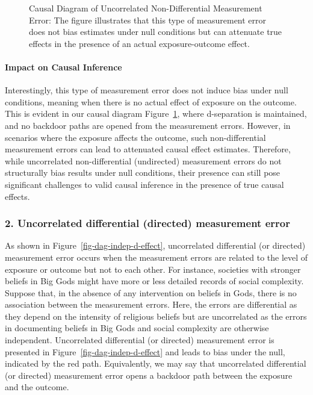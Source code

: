 \documentclass[
  singlecolumn,
  9pt]{article}
\let\oldparagraph\paragraph
\renewcommand{\paragraph}[1]{\oldparagraph{#1}\mbox{}}
\begin{document}
\begin{figure}


\caption{\label{fig-2}Causal Diagram of Uncorrelated Non-Differential
Measurement Error: The figure illustrates that this type of measurement
error does not bias estimates under null conditions but can attenuate
true effects in the presence of an actual exposure-outcome effect.}

\end{figure}%

\paragraph{Impact on Causal Inference}\label{impact-on-causal-inference}

Interestingly, this type of measurement error does not induce bias under
null conditions, meaning when there is no actual effect of exposure on
the outcome. This is evident in our causal diagram Figure~\ref{fig-2},
where d-separation is maintained, and no backdoor paths are opened from
the measurement errors. However, in scenarios where the exposure affects
the outcome, such non-differential measurement errors can lead to
attenuated causal effect estimates. Therefore, while uncorrelated
non-differential (undirected) measurement errors do not structurally
bias results under null conditions, their presence can still pose
significant challenges to valid causal inference in the presence of true
causal effects.

\subsubsection{2. Uncorrelated differential (directed) measurement
error}\label{uncorrelated-differential-directed-measurement-error}

As shown in Figure~\ref{fig-dag-indep-d-effect}, uncorrelated
differential (or directed) measurement error occurs when the measurement
errors are related to the level of exposure or outcome but not to each
other. For instance, societies with stronger beliefs in Big Gods might
have more or less detailed records of social complexity. Suppose that,
in the absence of any intervention on beliefs in Gods, there is no
association between the measurement errors. Here, the errors are
differential as they depend on the intensity of religious beliefs but
are uncorrelated as the errors in documenting beliefs in Big Gods and
social complexity are otherwise independent. Uncorrelated differential
(or directed) measurement error is presented in
Figure~\ref{fig-dag-indep-d-effect} and leads to bias under the null,
indicated by the red path. Equivalently, we may say that uncorrelated
differential (or directed) measurement error opens a backdoor path
between the exposure and the outcome.
\end{document}
